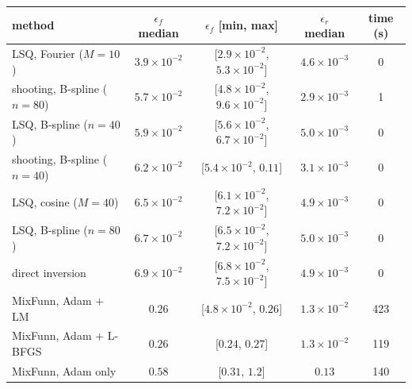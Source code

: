 \begin{tabular}{lcccc}
\toprule
method & $\epsilon_f$ median & $\epsilon_f$ [min, max] & $\epsilon_r$ median & time (s) \\
\midrule
LSQ, Fourier ($M{=}10$) & $3.9\times10^{-2}$ & [$2.9\times10^{-2}$, $5.3\times10^{-2}$] & $4.6\times10^{-3}$ & 0 \\
shooting, B-spline ($n{=}80$) & $5.7\times10^{-2}$ & [$4.8\times10^{-2}$, $9.6\times10^{-2}$] & $2.9\times10^{-3}$ & 1 \\
LSQ, B-spline ($n{=}40$) & $5.9\times10^{-2}$ & [$5.6\times10^{-2}$, $6.7\times10^{-2}$] & $5.0\times10^{-3}$ & 0 \\
shooting, B-spline ($n{=}40$) & $6.2\times10^{-2}$ & [$5.4\times10^{-2}$, $0.11$] & $3.1\times10^{-3}$ & 0 \\
LSQ, cosine ($M{=}40$) & $6.5\times10^{-2}$ & [$6.1\times10^{-2}$, $7.2\times10^{-2}$] & $4.9\times10^{-3}$ & 0 \\
LSQ, B-spline ($n{=}80$) & $6.7\times10^{-2}$ & [$6.5\times10^{-2}$, $7.2\times10^{-2}$] & $5.0\times10^{-3}$ & 0 \\
direct inversion & $6.9\times10^{-2}$ & [$6.8\times10^{-2}$, $7.5\times10^{-2}$] & $4.9\times10^{-3}$ & 0 \\
MixFunn, Adam + LM & $0.26$ & [$4.8\times10^{-2}$, $0.26$] & $1.3\times10^{-2}$ & 423 \\
MixFunn, Adam + L-BFGS & $0.26$ & [$0.24$, $0.27$] & $1.3\times10^{-2}$ & 119 \\
MixFunn, Adam only & $0.58$ & [$0.31$, $1.2$] & $0.13$ & 140 \\
\bottomrule
\end{tabular}
